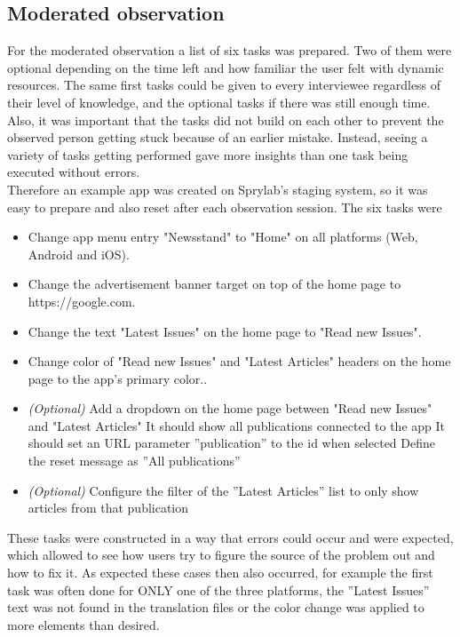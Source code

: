 \subsection{Moderated observation}
\label{subsec:modobs}
For the moderated observation a list of six tasks was prepared. Two of them were optional depending on the time left and how familiar the user felt with dynamic resources.
The same first tasks could be given to every interviewee regardless of their level of knowledge, and the optional tasks if there was still enough time.
Also, it was important that the tasks did not build on each other to prevent the observed person getting stuck because of an earlier mistake.
Instead, seeing a variety of tasks getting performed gave more insights than one task being executed without errors. 
\\
Therefore an example app was created on Sprylab's staging system, so it was easy to prepare and also reset after each observation session.
The six tasks were
\begin{itemize}[itemsep=0mm]
  \item Change app menu entry "Newsstand" to "Home" on all platforms (Web, Android and iOS).
  \item Change the advertisement banner target on top of the home page to https://google.com. 
  \item Change the text "Latest Issues" on the home page to "Read new Issues".
  \item Change color of "Read new Issues" and "Latest Articles" headers on the home page to the app's primary color..
  \item \textit{(Optional)} Add a dropdown on the home page between "Read new Issues" and "Latest Articles"
    \subitem It should show all publications connected to the app
    \subitem It should set an URL parameter ''publication'' to the id when selected
    \subitem Define the reset message as ''All publications''
  \item \textit{(Optional)} Configure the filter of the ''Latest Articles'' list to only show articles from that publication
\end{itemize}

These tasks were constructed in a way that errors could occur and were expected, which allowed to see how users try to figure the source of the problem out and how to fix it.
As expected these cases then also occurred, for example the first task was often done for ONLY one of the three platforms, the ''Latest Issues'' text was not found in the translation files or the color change was applied to more elements than desired.

